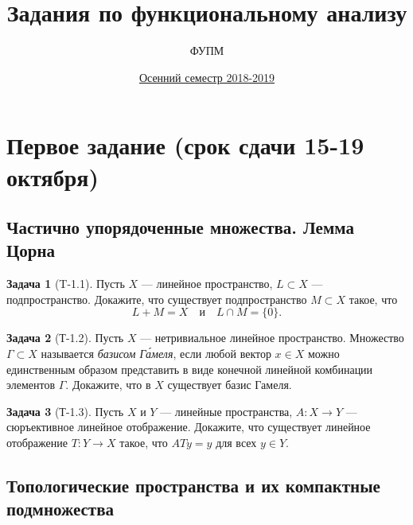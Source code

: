 \documentclass{article}
\theoremstyle{definition}
\newtheorem{problem}{Задача}
\begin{document}
\title{Задания по функциональному анализу}
\date{\href{https://mipt.ru/education/chair/mathematics/process/progs1/3_kyrs/10\%D1\%84.pdf}{Осенний семестр 2018-2019}}
\author{ФУПМ}
\maketitle

\tableofcontents

\section{Первое задание (срок сдачи 15-19 октября)}


\subsection{Частично упорядоченные множества. Лемма Цорна}


\begin{problem}[T-1.1]
Пусть $X$ --- линейное пространство, $L\subset X$ --- подпространство.
Докажите, что существует подпространство $M\subset X$ такое, что
\begin{equation*}
L+M = X \quad\text{и}\quad L \cap M = \{0\}.
\end{equation*}
\end{problem}

\begin{problem}[Т-1.2]
Пусть $X$ --- нетривиальное линейное пространство.
Множество $\Gamma \subset X$ называется \emph{базисом Г\'{а}меля},
если любой вектор $x\in X$ можно единственным образом представить
в виде конечной линейной комбинации элементов $\Gamma$.
Докажите, что в $X$ существует базис Гамеля.
\end{problem}

\begin{problem}[Т-1.3]
Пусть $X$ и $Y$ --- линейные пространства, $A\colon X\to Y$ ---
сюръективное линейное отображение. Докажите, что существует
линейное отображение $T\colon Y\to X$ такое, что $ATy = y$
для всех $y\in Y$.
\end{problem}

\subsection{Топологические пространства и их компактные подмножества}
\end{document}
